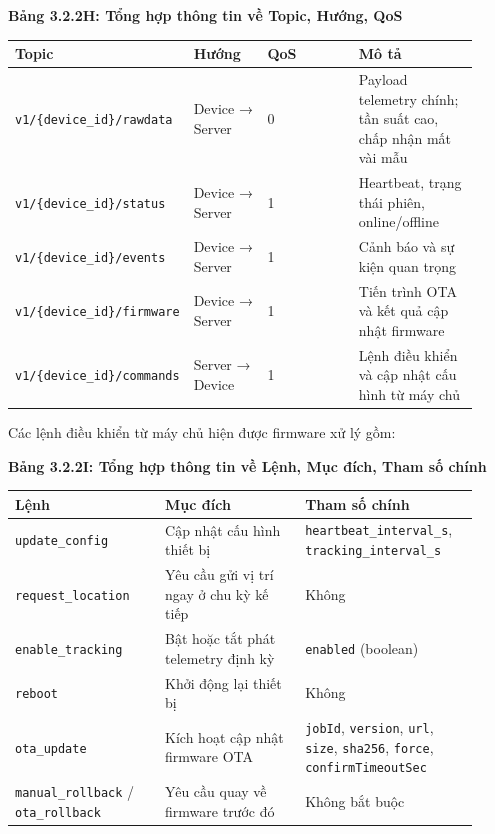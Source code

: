 \documentclass[13pt,a4paper]{extarticle}
\newcounter{none} %
\newcommand{\thesislongtableorignewline}{}
\let\thesislongtableorignewline\\
\renewcommand{\\}{\thesislongtableorignewline\hline}%
\let\\\thesislongtableorignewline
\newcommand{\thesistabletitle}[1]{%
  \begin{center}\textbf{#1}\end{center}%
}
\begin{document}
{\def\LTcaptype{none} %
\thesistabletitle{Bảng 3.2.2H: Tổng hợp thông tin về Topic, Hướng, QoS}

\begin{longtable}{|p{0.30\linewidth}|p{0.16\linewidth}|p{0.20\linewidth}|p{0.26\linewidth}|}
\hline \textbf{Topic} & \textbf{Hướng} & \textbf{QoS} & \textbf{Mô tả} \\
\hline
\endhead
\hline
\endlastfoot
\nolinkurl{v1/{device_id}/rawdata} & Device → Server & 0 &
Payload telemetry chính; tần suất cao, chấp nhận mất vài mẫu \\
\nolinkurl{v1/{device_id}/status} & Device → Server & 1 &
Heartbeat, trạng thái phiên, online/offline \\
\nolinkurl{v1/{device_id}/events} & Device → Server & 1 &
Cảnh báo và sự kiện quan trọng \\
\nolinkurl{v1/{device_id}/firmware} & Device → Server & 1
& Tiến trình OTA và kết quả cập nhật firmware \\
\nolinkurl{v1/{device_id}/commands} & Server → Device & 1
& Lệnh điều khiển và cập nhật cấu hình từ máy chủ \\
\end{longtable}
}

Các lệnh điều khiển từ máy chủ hiện được firmware xử lý gồm:

{\def\LTcaptype{none} %
\thesistabletitle{Bảng 3.2.2I: Tổng hợp thông tin về Lệnh, Mục đích, Tham số chính}

\begin{longtable}{|p{0.30\linewidth}|p{0.28\linewidth}|p{0.34\linewidth}|}
\hline \textbf{Lệnh} & \textbf{Mục đích} & \textbf{Tham số chính} \\
\hline
\endhead
\hline
\endlastfoot
\texttt{update\_config} & Cập nhật cấu hình thiết bị &
\texttt{heartbeat\_interval\_s}, \texttt{tracking\_interval\_s} \\
\texttt{request\_location} & Yêu cầu gửi vị trí ngay ở chu kỳ kế tiếp &
Không \\
\texttt{enable\_tracking} & Bật hoặc tắt phát telemetry định kỳ &
\texttt{enabled} (boolean) \\
\texttt{reboot} & Khởi động lại thiết bị & Không \\
\texttt{ota\_update} & Kích hoạt cập nhật firmware OTA & \texttt{jobId},
\texttt{version}, \texttt{url}, \texttt{size}, \texttt{sha256},
\texttt{force}, \texttt{confirmTimeoutSec} \\
\texttt{manual\_rollback} / \texttt{ota\_rollback} & Yêu cầu quay về
firmware trước đó & Không bắt buộc \\
\end{longtable}
}
\end{document}
